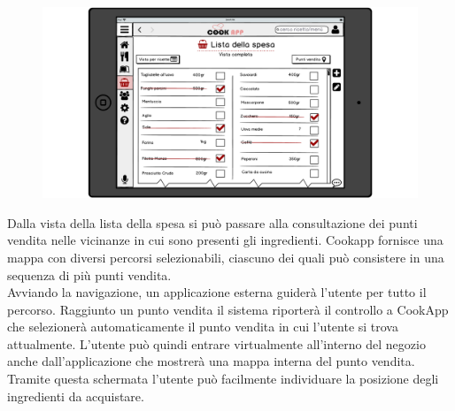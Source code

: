 \begin{itemize}
\begin{figure}[H]
\end{figure}
\begin{figure}[H]
	\centering
	\includegraphics[width=0.95\linewidth]{img/mockup/spesa-completa.png}
\end{figure}

Dalla vista della lista della spesa si può passare alla consultazione
dei punti vendita nelle vicinanze in cui sono presenti gli ingredienti.
Cookapp fornisce una mappa con diversi percorsi selezionabili, ciascuno dei quali
può consistere in una sequenza di più punti vendita.\\ 
Avviando la
navigazione, un applicazione esterna guiderà l'utente per tutto il
percorso. Raggiunto un punto vendita il sistema riporterà il controllo a
CookApp che selezionerà automaticamente il punto vendita in cui l'utente
si trova attualmente. L'utente può quindi entrare virtualmente all'interno del
negozio anche dall'applicazione che mostrerà una mappa interna del punto
vendita. Tramite questa schermata l'utente può facilmente individuare
la posizione degli ingredienti da acquistare.


\end{itemize}
